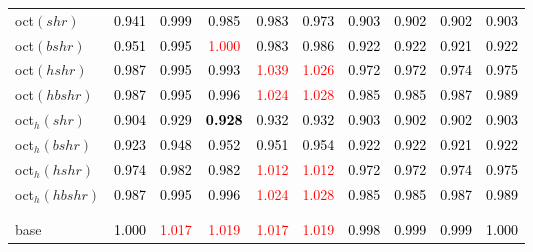 \begin{tabular}[t]{l|ccccccccc}
oct$(shr)$ & \textcolor{black}{0.941} & \textcolor{black}{0.999} & \textcolor{black}{0.985} & \textcolor{black}{0.983} & \textcolor{black}{0.973} & \textcolor{black}{0.903} & \textcolor{black}{0.902} & \textcolor{black}{0.902} & \textcolor{black}{0.903}\\
oct$(bshr)$ & \textcolor{black}{0.951} & \textcolor{black}{0.995} & \textcolor{red}{1.000} & \textcolor{black}{0.983} & \textcolor{black}{0.986} & \textcolor{black}{0.922} & \textcolor{black}{0.922} & \textcolor{black}{0.921} & \textcolor{black}{0.922}\\
oct$(hshr)$ & \textcolor{black}{0.987} & \textcolor{black}{0.995} & \textcolor{black}{0.993} & \textcolor{red}{1.039} & \textcolor{red}{1.026} & \textcolor{black}{0.972} & \textcolor{black}{0.972} & \textcolor{black}{0.974} & \textcolor{black}{0.975}\\
oct$(hbshr)$ & \textcolor{black}{0.987} & \textcolor{black}{0.995} & \textcolor{black}{0.996} & \textcolor{red}{1.024} & \textcolor{red}{1.028} & \textcolor{black}{0.985} & \textcolor{black}{0.985} & \textcolor{black}{0.987} & \textcolor{black}{0.989}\\
oct$_h(shr)$ & \textcolor{black}{0.904} & \textcolor{black}{0.929} & \textcolor{black}{\textbf{0.928}} & \textcolor{black}{0.932} & \textcolor{black}{0.932} & \textcolor{black}{0.903} & \textcolor{black}{0.902} & \textcolor{black}{0.902} & \textcolor{black}{0.903}\\
oct$_h(bshr)$ & \textcolor{black}{0.923} & \textcolor{black}{0.948} & \textcolor{black}{0.952} & \textcolor{black}{0.951} & \textcolor{black}{0.954} & \textcolor{black}{0.922} & \textcolor{black}{0.922} & \textcolor{black}{0.921} & \textcolor{black}{0.922}\\
oct$_h(hshr)$ & \textcolor{black}{0.974} & \textcolor{black}{0.982} & \textcolor{black}{0.982} & \textcolor{red}{1.012} & \textcolor{red}{1.012} & \textcolor{black}{0.972} & \textcolor{black}{0.972} & \textcolor{black}{0.974} & \textcolor{black}{0.975}\\
oct$_h(hbshr)$ & \textcolor{black}{0.987} & \textcolor{black}{0.995} & \textcolor{black}{0.996} & \textcolor{red}{1.024} & \textcolor{red}{1.028} & \textcolor{black}{0.985} & \textcolor{black}{0.985} & \textcolor{black}{0.987} & \textcolor{black}{0.989}\\[-1.5ex]
\hline\\[-1.5ex]
\addlinespace[0.3em]
\multicolumn{10}{c}{\textbf{$k = 1$}}\\
base & \textcolor{black}{1.000} & \textcolor{red}{1.017} & \textcolor{red}{1.019} & \textcolor{red}{1.017} & \textcolor{red}{1.019} & \textcolor{black}{0.998} & \textcolor{black}{0.999} & \textcolor{black}{0.999} & \textcolor{black}{1.000}\\

\end{tabular}
